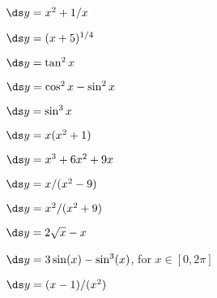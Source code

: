 \begin{enumialphparenastyle}
\begin{ex}
	$\ds y = x^2+ 1/x$
\end{ex}

\begin{ex}
	$\ds y = (x+5)^{1/4}$
\end{ex}

\begin{ex}
	$\ds y = \tan^2 x$
\end{ex}

\begin{ex}
	$\ds y =\cos^2 x - \sin^2 x$
\end{ex}

\begin{ex}
	$\ds y = \sin^3 x$
\end{ex}

\begin{ex}
	$\ds y=x(x^2+1)$
\end{ex}

\begin{ex}
	$\ds y=x^3+6x^2 + 9x$
\end{ex}

\begin{ex}
	$\ds y=x/(x^2-9)$
\end{ex}

\begin{ex}
	$\ds y=x^2/(x^2+9)$
\end{ex}

\begin{ex}
	$\ds y=2\sqrt{x} - x$
\end{ex}

\begin{ex}
	$\ds y=3\sin(x) - \sin^3(x)$, for $x\in[0,2\pi]$
\end{ex}

\begin{ex}
	$\ds y=(x-1)/(x^2)$
\end{ex}

\end{enumialphparenastyle}